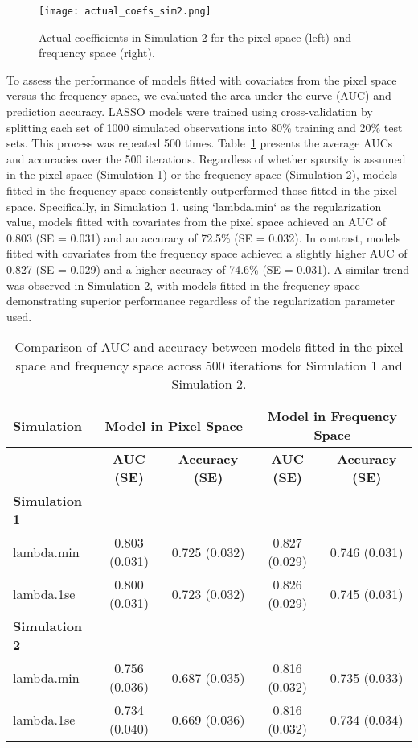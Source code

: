 \documentclass[12pt]{article}
\begin{document}
\begin{figure}[htbp] 
	\centering
	\texttt{[image: actual\_coefs\_sim2.png]}
  \caption{Actual coefficients in Simulation 2 for the pixel space (left) and frequency space (right).}
  \label{fig:coefs_sim2}
\end{figure}

To assess the performance of models fitted with covariates from the pixel space versus the frequency space, we evaluated
the area under the curve (AUC) and prediction accuracy. LASSO models were trained using cross-validation by splitting
each set of 1000 simulated observations into 80\% training and 20\% test sets. This process was repeated 500 times.
Table~\ref*{tab:auc_acc_table} presents the average AUCs and accuracies over the 500 iterations. Regardless of whether
sparsity is assumed in the pixel space (Simulation 1) or the frequency space (Simulation 2), models fitted in the
frequency space consistently outperformed those fitted in the pixel space. Specifically, in Simulation 1, using
`lambda.min` as the regularization value,  models fitted with covariates from the pixel space achieved an AUC of
0.803 (SE = 0.031) and an accuracy of 72.5\% (SE = 0.032). In contrast, models fitted with covariates from the 
frequency space achieved a slightly higher AUC of 0.827 (SE = 0.029) and a higher accuracy of
74.6\% (SE = 0.031). A similar trend was observed in Simulation 2, with models fitted in the frequency space
demonstrating superior performance regardless of the regularization parameter used.

\begin{table}[htbp]
\centering
\caption{Comparison of AUC and accuracy between models fitted in the pixel space and frequency space across 500 iterations for Simulation 1 and Simulation 2.}
\label{tab:auc_acc_table}
\begin{tabular}{l|cc|cc}
\toprule
\textbf{Simulation} & \multicolumn{2}{c}{\textbf{Model in Pixel Space}} & \multicolumn{2}{c}{\textbf{Model in Frequency Space}} \\ 
\midrule
& \textbf{AUC (SE)} & \textbf{Accuracy (SE)} & \textbf{AUC (SE)} & \textbf{Accuracy (SE)} \\ 
\midrule
\textbf{Simulation 1} & & & & \\
lambda.min & 0.803 (0.031) & 0.725 (0.032) & 0.827 (0.029) & 0.746 (0.031) \\
lambda.1se & 0.800 (0.031) & 0.723 (0.032) & 0.826 (0.029) & 0.745 (0.031) \\ 
\midrule
\textbf{Simulation 2} & & & & \\
lambda.min & 0.756 (0.036) & 0.687 (0.035) & 0.816 (0.032) & 0.735 (0.033)  \\
lambda.1se & 0.734 (0.040) & 0.669 (0.036) & 0.816 (0.032) & 0.734 (0.034) \\
\bottomrule
\end{tabular}
\end{table}
\end{document}
